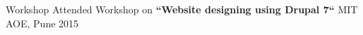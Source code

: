 \begin{cvhonors}

\cvhonor
{Workshop} %
{Attended Workshop on \textbf{“Website designing using Drupal 7“}\vspace{2pt}} %
{MIT AOE, Pune} %
{\vspace{2pt}2015} %


\end{cvhonors}
